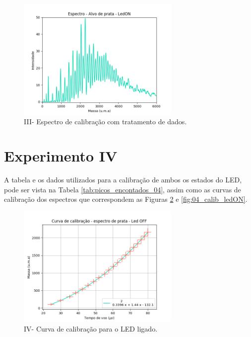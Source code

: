 \begin{figure}
  \centering  
  \includegraphics[width=0.7\textwidth]{exp_03/LEDON_espec_calib_ag_massa.png}
  \caption{III- Espectro de calibração com tratamento de dados.}
  \label{fig:03_ledon_massa} 
\end{figure}

\section{Experimento IV}
A tabela e os dados utilizados para a calibração de ambos os estados do LED, pode ser vista na Tabela \ref{tab:picos_encontados_04}, assim como as curvas de calibração dos espectros que correspondem as Figuras \ref{fig:04_calib_ledOFF} e \ref{fig:04_calib_ledON}.

\begin{figure}
  \centering  
  \includegraphics[width=0.7\textwidth]{exp_04/LEDOFF_curv+erro_calib.png}
  \caption{IV- Curva de calibração para o LED ligado.}
  \label{fig:04_calib_ledOFF} 
\end{figure}

